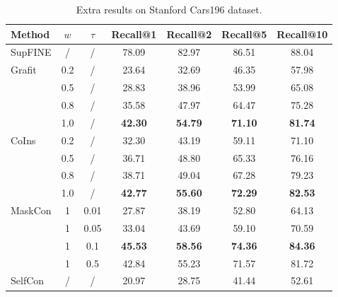 \documentclass[10pt,twocolumn,letterpaper]{article}
\begin{document}
\begin{table}[htbp]
\centering
\begin{tabular}{@{}l|c|c|cccc@{}}
\toprule
Method                  & $w$ & $\tau$ & Recall@1       & Recall@2       & Recall@5       & Recall@10      \\ \midrule
SupFINE                 & /   & /      & 78.09          & 82.97          & 86.51          & 88.04          \\ \midrule
\multirow{4}{*}{Grafit} & 0.2 & /      & 23.64          & 32.69          & 46.35          & 57.98          \\
                        & 0.5 & /      & 28.83          & 38.96          & 53.99          & 65.08          \\
                        & 0.8 & /      & 35.58          & 47.97          & 64.47          & 75.28          \\
                        & 1.0 & /      & \textbf{42.30} & \textbf{54.79} & \textbf{71.10} & \textbf{81.74} \\ \midrule
\multirow{4}{*}{CoIns}  & 0.2 & /      & 32.30          & 43.19          & 59.11          & 71.10          \\
                        & 0.5 & /      & 36.71          & 48.80          & 65.33          & 76.16          \\
                        & 0.8 & /      & 38.71          & 49.04          & 67.28          & 79.23          \\
                        & 1.0 & /      & \textbf{42.77} & \textbf{55.60} & \textbf{72.29} & \textbf{82.53} \\ \midrule
MaskCon                 & 1   & 0.01   & 27.87          & 38.19          & 52.80          & 64.13          \\
                        & 1   & 0.05   & 33.04          & 43.69          & 59.10          & 70.59          \\
                        & 1   & 0.1    & \textbf{45.53} & \textbf{58.56} & \textbf{74.36} & \textbf{84.36} \\
                        & 1   & 0.5    & 42.84          & 55.23          & 71.57          & 81.72          \\ \midrule
SelfCon                 & /   & /      & 20.97          & 28.75          & 41.44          & 52.61          \\ \bottomrule
\end{tabular}
\caption{Extra results on Stanford Cars196 dataset.}
\label{tab:cars196}
\end{table}
\end{document}
